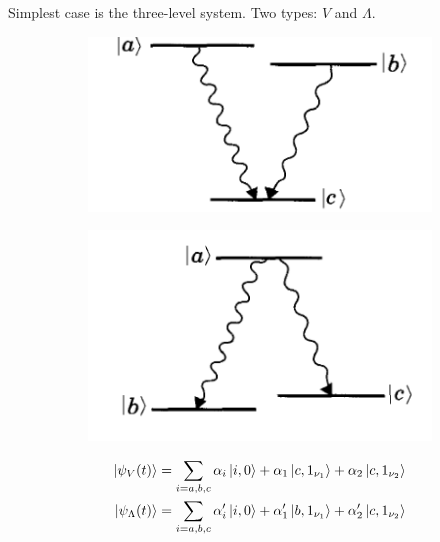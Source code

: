 \documentclass{beamer}
\theoremstyle{definition}
\newcommand{\al}{\alpha}
\begin{document}
\begin{frame}



Simplest case is the three-level system. Two types: $V$ and $\Lambda$.

\begin{figure}[!htb]
	\begin{subfigure}{0.45\textwidth}
		\includegraphics[width=\textwidth]{V.png}
	\end{subfigure}
	\begin{subfigure}{0.45\textwidth}
		\includegraphics[width=\textwidth]{A.png}
	\end{subfigure}
\end{figure}


\begin{align*}
\ket{\psi_V(t)} &=  \sum_{i=a,b,c} \al_i \ket{i,0} + \al_1\ket{c,1_{\nu_1}} + \al_2 \ket{c,1_{\nu_2}}\\
\ket{\psi_\Lambda(t)} &=  \sum_{i=a,b,c} \al_i' \ket{i,0} + \al_1'\ket{b,1_{\nu_1}} + \al_2' \ket{c,1_{\nu_2}}
\end{align*}

\end{frame}
\end{document}
